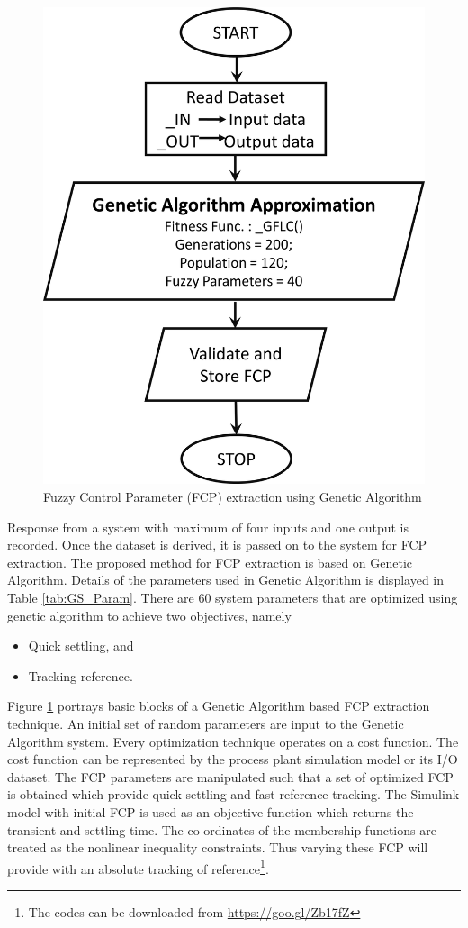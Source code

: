 \begin{figure}[h!]
	\centering
	\includegraphics[width=0.85\linewidth]{Chapter3/chapter3/Fig7_offline.eps}
	\caption{Fuzzy Control Parameter (FCP) extraction using Genetic Algorithm}
	\label{fig:fig3_7}
\end{figure}
Response from a system with maximum of four inputs and one output is recorded. Once the dataset is derived, it is passed on to the system for FCP extraction. The proposed method for FCP extraction is based on Genetic Algorithm. Details of the parameters used in Genetic Algorithm is displayed in Table \ref{tab:GS_Param}. There are 60 system parameters that are optimized using genetic algorithm to achieve two objectives, namely
\begin{itemize}
	\item Quick settling, and
	\item Tracking reference.
\end{itemize}
Figure \ref{fig:fig3_7} portrays basic blocks of a Genetic Algorithm based FCP extraction technique. An initial set of random parameters are input to the Genetic Algorithm system. Every optimization technique operates on a cost function. The cost function can be represented by the process plant simulation model or its I/O dataset. The FCP parameters are manipulated such that a set of optimized FCP is obtained which provide quick settling and fast reference tracking.  
The Simulink model with initial FCP is used as an objective function which returns the transient and settling time. The co-ordinates of the membership functions are treated as the nonlinear inequality constraints. Thus varying these FCP will provide with an absolute tracking of reference\footnote{The codes can be downloaded from \url{https://goo.gl/Zb17fZ}}.

